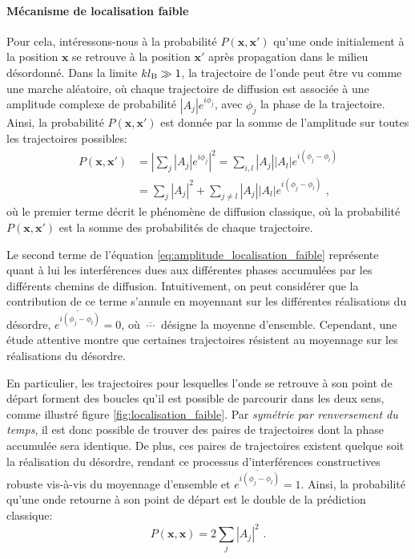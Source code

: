 \paragraph*{Mécanisme de localisation faible}
Pour cela, intéressons-nous à la probabilité $P(\mathbf{x},\mathbf{x}')$ qu'une onde initialement à la position $\mathbf{x}$ se retrouve à la position $\mathbf{x}'$ après propagation dans le milieu désordonné. Dans la limite $kl_{\mathrm{B}}\gg 1$, la trajectoire de l'onde peut être vu comme une marche aléatoire, où chaque trajectoire de diffusion est associée à une amplitude complexe de probabilité $\left| A_j \right| e^{i \phi_j}$, avec $\phi_j$ la phase de la trajectoire. Ainsi, la probabilité $P(\mathbf{x},\mathbf{x}')$ est donnée par la somme de l'amplitude sur toutes les trajectoires possibles:
\begin{align}
P(\mathbf{x},\mathbf{x}') \nonumber&= {\left| \sum_j{ \left|A_j\right| e^{i \phi_j} }\right| }^2 = \sum_{i,l} {\left| A_j \right| \left| A_l \right| e^{i (\phi_j - \phi_l)}} \\
&= \sum_j{{\left| A_j \right|}^2} + \sum_{j\neq l}{\left| A_j \right| \left|A_l \right| e^{i(\phi_j - \phi_l)}} \text{ ,}
\label{eq:amplitude_localisation_faible}
\end{align}
où le premier terme décrit le phénomène de diffusion classique, où la probabilité $P(\mathbf{x},\mathbf{x}')$ est la somme des probabilités de chaque trajectoire. 

Le second terme de l'équation \ref{eq:amplitude_localisation_faible} représente quant à lui les interférences dues aux différentes phases accumulées par les différents chemins de diffusion. Intuitivement, on peut considérer que la contribution de ce terme s'annule en moyennant sur les différentes réalisations du désordre, $\overline{e^{i(\phi_j - \phi_l)}}=0$, où $\overline{\:\cdots\:}$ désigne la moyenne d'ensemble. Cependant, une étude attentive montre que certaines trajectoires résistent au moyennage sur les réalisations du désordre.

En particulier, les trajectoires pour lesquelles l'onde se retrouve à son point de départ forment des boucles qu'il est possible de parcourir dans les deux sens, comme illustré figure \ref{fig:localisation_faible}. Par \emph{symétrie par renversement du temps}, il est donc possible de trouver des paires de trajectoires dont la phase accumulée sera identique. De plus, ces paires de trajectoires existent quelque soit la réalisation du désordre, rendant ce processus d'interférences constructives robuste vis-à-vis du moyennage d'ensemble et $\overline{e^{i(\phi_j - \phi_l)}}=1$. Ainsi, la probabilité qu'une onde retourne à son point de départ est le double de la prédiction classique:
\begin{equation}
P(\mathbf{x},\mathbf{x})=2 \sum_j{{\left| A_j \right|}^2} \text{ .}
\label{eq:proba_retour_origine}
\end{equation}

